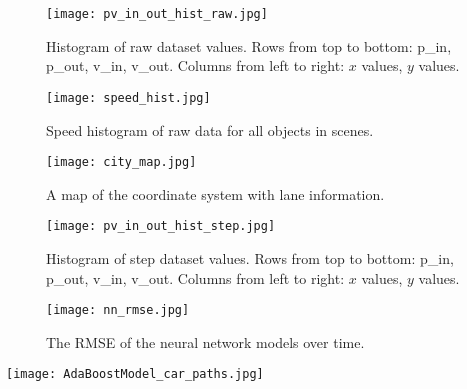 \documentclass{article}
\newenvironment{changemargin}[2]{%
\begin{list}{}{%
\setlength{\topsep}{0pt}%
\setlength{\leftmargin}{#1}%
\setlength{\rightmargin}{#2}%
\setlength{\listparindent}{\parindent}%
\setlength{\itemindent}{\parindent}%
\setlength{\parsep}{\parskip}%
}%
\item[]}{\end{list}}
\begin{document}
\begin{figure}
\hspace*{-1cm} 
  \texttt{[image: pv\_in\_out\_hist\_raw.jpg]}
  \caption{Histogram of raw dataset values. Rows from top to bottom: p\_in, p\_out, v\_in, v\_out. Columns from left to right: $x$ values, $y$ values.}
\end{figure}

\begin{figure}
  \texttt{[image: speed\_hist.jpg]}
  \caption{Speed histogram of raw data for all objects in scenes.}
\end{figure}

\begin{figure}
\hspace*{-1cm} 
  \texttt{[image: city\_map.jpg]}
  \caption{A map of the coordinate system with lane information.}
\end{figure}

\begin{figure}
\hspace*{-1cm} 
  \texttt{[image: pv\_in\_out\_hist\_step.jpg]}
  \caption{Histogram of step dataset values. Rows from top to bottom: p\_in, p\_out, v\_in, v\_out. Columns from left to right: $x$ values, $y$ values.}
\end{figure}

\begin{figure}
  \texttt{[image: nn\_rmse.jpg]}
  \caption{The RMSE of the neural network models over time.}
\end{figure}

\begin{changemargin}{-7cm}{-6cm}
\setlength{\voffset}{-0.75in}
\setlength{\headsep}{5pt}
\begin{minipage}{\linewidth}
\centering
  \texttt{[image: AdaBoostModel\_car\_paths.jpg]}
\end{minipage}
\end{changemargin}
\end{document}
